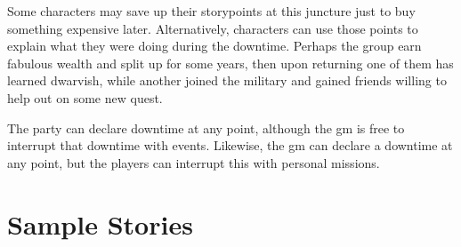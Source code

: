 \begin{multicols}{2}
Some characters may save up their \glspl{storypoint} at this juncture just to buy something expensive later.
Alternatively, characters can use those points to explain what they were doing during the \gls{downtime}.
Perhaps the group earn fabulous wealth and split up for some years, then upon returning one of them has learned dwarvish, while another joined the military and gained friends willing to help out on some new quest.

The party can declare \gls{downtime} at any point, although the \gls{gm} is free to interrupt that \gls{downtime} with events.
Likewise, the \gls{gm} can declare a \gls{downtime} at any point, but the players can interrupt this with personal missions.

\end{multicols}

\section{Sample Stories}

